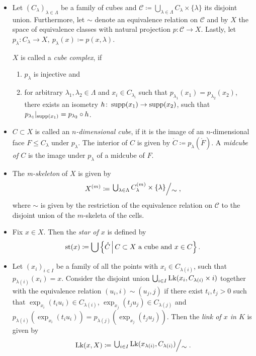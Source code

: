 \begin{defin}
  \begin{itemize}
  \item Let \((C_\lambda)_{\lambda \in \Lambda}\) be a family of cubes and \(\mathcal{C} \coloneqq \bigcup_{\lambda \in \Lambda} C_\lambda \times \{\lambda\}\) its disjoint union. Furthermore, let \(\sim\) denote an equivalence relation on \(\mathcal{C}\) and by \(X\) the space of equivalence classes with natural projection \(p \colon \mathcal{C} \to X\). Lastly, let \(p_\lambda \colon C_\lambda \to X,\ p_\lambda(x) \coloneqq p(x, \lambda)\).

    \(X\) is called a \emph{cube complex}, if
    \begin{enumerate}
    \item \(p_\lambda\) is injective and
    \item for arbitrary \(\lambda_1, \lambda_2 \in \Lambda\) and \(x_i \in C_{\lambda_i}\) such that \(p_{\lambda_1}(x_1) = p_{\lambda_2}(x_2)\), there exists an isometry \(h\colon \operatorname{supp}(x_1) \to \operatorname{supp}(x_2)\), such that \(p_{\lambda_1}|_{\operatorname{supp}(x_1)} = p_{\lambda_2} \circ h\).
    \end{enumerate}
  \item \(C \subset X\) is called an \emph{\(n\)-dimensional cube}, if it is the image of an \(n\)-dimensional face \(F \leq C_\lambda\) under \(p_\lambda\). The interior of \(C\) is given by \(\mathring C \coloneqq p_\lambda(\mathring F)\). A \emph{midcube of \(C\)} is the image under \(p_\lambda\) of a midcube of \(F\).
  \item The \emph{m-skeleton} of \(X\) is given by
    \begin{align*}
      X^{(m)} \coloneqq \quot{\bigcup_{\lambda \in \Lambda} C_\lambda^{(m)} \times \{\lambda\}}{\sim},
    \end{align*}
    where \(\sim\) is given by the restriction of the equivalence relation on \(\mathcal{C}\) to the disjoint union of the \(m\)-skeleta of the cells.

  \item Fix \(x \in X\). Then the \emph{star of \(x\)} is defined by
    \begin{align*}
      \operatorname{st}(x) \coloneqq \bigcup \left\{\mathring C \,\middle|\, C \subset X \text{ a cube and } x \in C\right\}.
    \end{align*}
  \item Let \((x_i)_{i \in I}\) be a family of all the points with \(x_i \in C_{\lambda(i)}\), such that \(p_{\lambda(i)}(x_i) = x\). Consider the disjoint union \(\bigcup_{i \in I} \operatorname{Lk}(x_i, C_{\lambda(i)} \times {i})\) together with the equivalence relation \((u_i, i) \sim (u_j, j)\) if there exist \(t_i, t_j > 0\) such that \(\exp_{x_i}(t_i u_i) \in C_{\lambda(i)}\), \(\exp_{x_j}(t_j u_j) \in C_{\lambda(j)}\) and \(p_{\lambda(i)}(\exp_{x_i}(t_i u_i)) = p_{\lambda(j)}(\exp_{x_j}(t_j u_j))\). Then the \emph{link of \(x\) in \(K\)} is given by
    \begin{align*}
      \lk(x, X) \coloneqq \quot{\bigcup_{i \in I} \lk(x_{\lambda(i)}, C_{\lambda(i)})}{\sim}.
    \end{align*}
  \end{itemize}
\end{defin}

